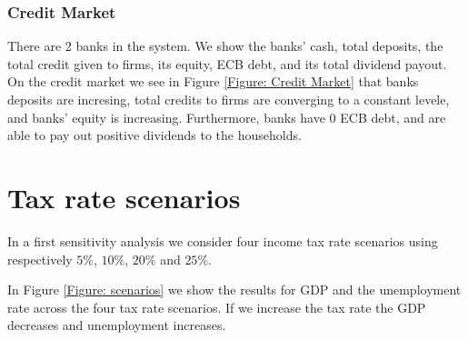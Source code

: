 \documentclass{article}
\begin{document}
\subsubsection*{Credit Market}
There are 2 banks in the system. 
We show the banks' cash, total deposits, the total credit given to firms, its equity, ECB debt, and its total dividend payout.
On the credit market we see in Figure \ref{Figure: Credit Market} that banks deposits are incresing, total credits to firms are converging to a constant levele, and banks' equity is increasing. Furthermore, banks have 0 ECB debt, and are able to pay out positive dividends to the households.


\section{Tax rate scenarios}
In a first sensitivity analysis we consider four income tax rate scenarios using respectively $5\%$, $10\%$, $20\%$ and $25\%$.

In Figure \ref{Figure: scenarios} we show the results for GDP and the unemployment rate across the four tax rate scenarios.
If we increase the tax rate the GDP decreases and unemployment increases.





\end{document}
